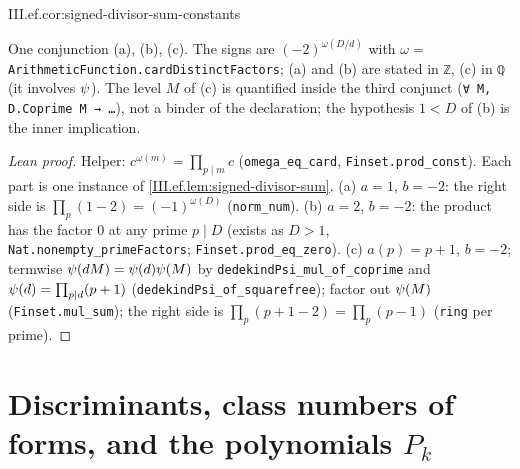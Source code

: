 \begin{corollary}
\end{corollary}
\begin{tfformal}{III.ef.cor:signed-divisor-sum-constants}
\begin{tffidelity}
One conjunction (a), (b), (c). The signs are $(-2)^{\omega(D/d)}$ with $\omega=$ \texttt{ArithmeticFunction.cardDistinctFactors}; (a) and (b) are stated in \texttt{ℤ}, (c) in \texttt{ℚ} (it involves $\psi$). The level $M$ of (c) is quantified inside the third conjunct (\texttt{∀ M, D.Coprime M → \dots}), not a binder of the declaration; the hypothesis $1<D$ of (b) is the inner implication.
\end{tffidelity}
\end{tfformal}
\begin{proof}[Lean proof]
Helper: $c^{\omega(m)}=\prod_{p\mid m}c$ (\texttt{omega\_eq\_card}, \texttt{Finset.prod\_const}). Each part is one instance of \cref{III.ef.lem:signed-divisor-sum}. (a) $a=1$, $b=-2$: the right side is $\prod_p(1-2)=(-1)^{\omega(D)}$ (\texttt{norm\_num}). (b) $a=2$, $b=-2$: the product has the factor $0$ at any prime $p\mid D$ (exists as $D>1$, \texttt{Nat.nonempty\_primeFactors}; \texttt{Finset.prod\_eq\_zero}). (c) $a(p)=p+1$, $b=-2$; termwise $\psi(dM)=\psi(d)\psi(M)$ by \texttt{dedekindPsi\_mul\_of\_coprime} and $\psi(d)=\prod_{p\mid d}(p+1)$ (\texttt{dedekindPsi\_of\_squarefree}); factor out $\psi(M)$ (\texttt{Finset.mul\_sum}); the right side is $\prod_p(p+1-2)=\prod_p(p-1)$ (\texttt{ring} per prime).
\end{proof}

\section{Discriminants, class numbers of forms, and the polynomials \texorpdfstring{$P_k$}{P\_k}}\label{sec:ef-discr}

